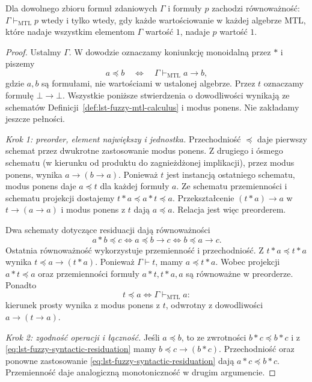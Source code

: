 \begin{twierdzenie}
\label{thm:lst-fuzzy-mtl-general-completeness}
Dla dowolnego zbioru formuł zdaniowych $\Gamma$ i formuły $p$
zachodzi równoważność: $\Gamma\vdash_{\mathrm{MTL}}p$ wtedy
i tylko wtedy, gdy każde wartościowanie w każdej algebrze
MTL, które nadaje wszystkim elementom $\Gamma$ wartość $1$,
nadaje $p$ wartość $1$.
\end{twierdzenie}
\begin{proof}
Ustalmy $\Gamma$. W dowodzie oznaczamy koniunkcję monoidalną
przez $*$ i piszemy
\[
 a\preccurlyeq b\quad\Longleftrightarrow\quad
 \Gamma\vdash_{\mathrm{MTL}}a\to b,
\]
gdzie $a,b$ są formułami, nie wartościami w ustalonej algebrze.
Przez $t$ oznaczamy formułę $\bot\to\bot$.
Wszystkie poniższe stwierdzenia o dowodliwości wynikają
ze schematów Definicji~\ref{def:lst-fuzzy-mtl-calculus}
i modus ponens. Nie zakładamy jeszcze pełności.

\emph{Krok 1: preorder, element największy i jednostka.}
Przechodniość $\preccurlyeq$ daje pierwszy schemat
przez dwukrotne zastosowanie modus ponens.
Z drugiego i ósmego schematu (w kierunku od produktu
do zagnieżdżonej implikacji), przez modus ponens,
wynika $a\to(b\to a)$.
Ponieważ $t$ jest instancją ostatniego schematu, modus ponens
daje $a\preccurlyeq t$ dla każdej formuły $a$.
Ze schematu przemienności i schematu projekcji dostajemy
$t*a\preccurlyeq a*t\preccurlyeq a$. Przekształcenie
$(t*a)\to a$ w $t\to(a\to a)$ i modus ponens z $t$
dają $a\preccurlyeq a$. Relacja jest więc preorderem.

Dwa schematy dotyczące residuacji dają równoważności
\begin{equation}\label{eq:lst-fuzzy-syntactic-residuation}
 a*b\preccurlyeq c
 \iff a\preccurlyeq b\to c
 \iff b\preccurlyeq a\to c.
\end{equation}
Ostatnia równoważność wykorzystuje przemienność i przechodniość.
Z $t*a\preccurlyeq t*a$ wynika $t\preccurlyeq a\to(t*a)$.
Ponieważ $\Gamma\vdash t$, mamy $a\preccurlyeq t*a$.
Wobec projekcji $a*t\preccurlyeq a$ oraz przemienności
formuły $a*t,t*a,a$ są równoważne w preorderze.
Ponadto
\[
 t\preccurlyeq a\iff\Gamma\vdash_{\mathrm{MTL}}a:
\]
kierunek prosty wynika z modus ponens z $t$, odwrotny
z dowodliwości $a\to(t\to a)$.

\emph{Krok 2: zgodność operacji i łączność.}
Jeśli $a\preccurlyeq b$, to ze zwrotności
$b*c\preccurlyeq b*c$ i z \eqref{eq:lst-fuzzy-syntactic-residuation}
mamy $b\preccurlyeq c\to(b*c)$. Przechodniość oraz ponowne
zastosowanie \eqref{eq:lst-fuzzy-syntactic-residuation}
dają $a*c\preccurlyeq b*c$. Przemienność daje analogiczną
monotoniczność w drugim argumencie.


\end{proof}
